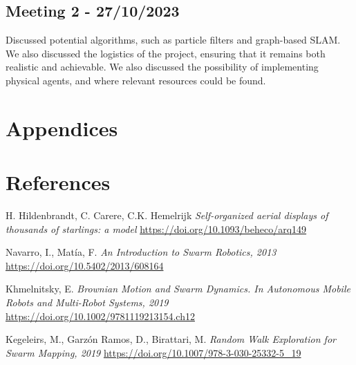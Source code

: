 \documentclass[12pt]{article}
\begin{document}
\subsection{Meeting 2 - 27/10/2023}
Discussed potential algorithms, such as particle filters and graph-based SLAM. We also discussed the logistics of the project,
ensuring that it remains both realistic and achievable. We also discussed the possibility of implementing physical agents,
and where relevant resources could be found.

\section{Appendices}

\section{References}

\begin{thebibliography}{9}

    H. Hildenbrandt, C. Carere, C.K. Hemelrijk
    \textit{Self-organized aerial displays of thousands of starlings: a model}
    \href{https://doi.org/10.1093/beheco/arq149}{https://doi.org/10.1093/beheco/arq149}

    Navarro, I., Matía, F.
    \textit{An Introduction to Swarm Robotics, 2013}
    \href{https://doi.org/10.5402/2013/608164}{https://doi.org/10.5402/2013/608164}

    Khmelnitsky, E.
    \textit{Brownian Motion and Swarm Dynamics. In Autonomous Mobile Robots and Multi-Robot Systems, 2019}
    \href{https://doi.org/10.1002/9781119213154.ch12}{https://doi.org/10.1002/9781119213154.ch12}

    Kegeleirs, M., Garzón Ramos, D., Birattari, M.
    \textit{Random Walk Exploration for Swarm Mapping, 2019}
    \href{https://doi.org/10.1007/978-3-030-25332-5_19}{https://doi.org/10.1007/978-3-030-25332-5_19}

\end{thebibliography}
\end{document}
